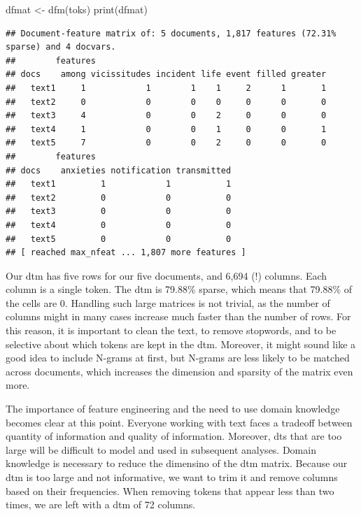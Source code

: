 \documentclass[
  12pt,
]{style/krantz}
\newenvironment{Shaded}{\begin{snugshade}}{\end{snugshade}}
\newcommand{\FunctionTok}[1]{\textcolor[rgb]{0.00,0.00,0.00}{#1}}
\newcommand{\NormalTok}[1]{#1}
\newcommand{\OtherTok}[1]{\textcolor[rgb]{0.56,0.35,0.01}{#1}}
\begin{document}
\begin{Shaded}
\begin{Highlighting}[]
\NormalTok{dfmat }\OtherTok{\textless{}{-}} \FunctionTok{dfm}\NormalTok{(toks)}
\FunctionTok{print}\NormalTok{(dfmat)}
\end{Highlighting}
\end{Shaded}

\begin{verbatim}
## Document-feature matrix of: 5 documents, 1,817 features (72.31% sparse) and 4 docvars.
##        features
## docs    among vicissitudes incident life event filled greater
##   text1     1            1        1    1     2      1       1
##   text2     0            0        0    0     0      0       0
##   text3     4            0        0    2     0      0       0
##   text4     1            0        0    1     0      0       1
##   text5     7            0        0    2     0      0       0
##        features
## docs    anxieties notification transmitted
##   text1         1            1           1
##   text2         0            0           0
##   text3         0            0           0
##   text4         0            0           0
##   text5         0            0           0
## [ reached max_nfeat ... 1,807 more features ]
\end{verbatim}

Our dtm has five rows for our five documents, and 6,694 (!) columns. Each column is a single token. The dtm is 79.88\% sparse, which means that 79.88\% of the cells are 0. Handling such large matrices is not trivial, as the number of columns might in many cases increase much faster than the number of rows. For this reason, it is important to clean the text, to remove stopwords, and to be selective about which tokens are kept in the dtm. Moreover, it might sound like a good idea to include N-grams at first, but N-grams are less likely to be matched across documents, which increases the dimension and sparsity of the matrix even more.

The importance of feature engineering and the need to use domain knowledge becomes clear at this point. Everyone working with text faces a tradeoff between quantity of information and quality of information. Moreover, dts that are too large will be difficult to model and used in subsequent analyses. Domain knowledge is necessary to reduce the dimensino of the dtm matrix. Because our dtm is too large and not informative, we want to trim it and remove columns based on their frequencies. When removing tokens that appear less than two times, we are left with a dtm of 72 columns.
\end{document}
